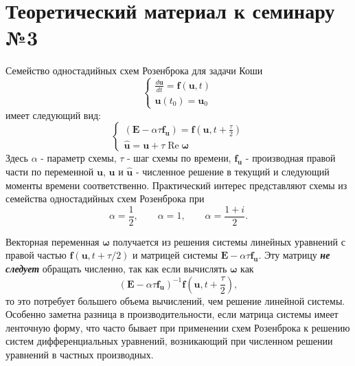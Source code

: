 \section{Теоретический материал к семинару №3}
Семейство одностадийных схем Розенброка для задачи Коши
\begin{equation} \label{c3eq1}
	\begin{cases}
		\displaystyle \frac{d\mathbf{u}}{dt} = \mathbf{f} \left( \mathbf{u}, t \right) \\
		\mathbf{u}(t_0) = \mathbf{u}_0
	\end{cases}
\end{equation}
имеет следующий вид:
\begin{equation} \label{c3eq2}
	\begin{cases}
		\displaystyle \left( \mathbf{E} - \alpha \tau \mathbf{f_u} \right) = \mathbf{f} \left( \mathbf{u}, t + \frac{\tau}{2} \right) \\
		\mathbf{\hat{u}} = \mathbf{u} + \tau \operatorname{Re} \boldsymbol{\omega}
	\end{cases}
\end{equation}
Здесь $\alpha$ - параметр схемы, $\tau$ - шаг схемы по времени, $\mathbf{f_u}$ - производная правой части по переменной $\mathbf{u}$, $\mathbf{u}$ и $\mathbf{\hat{u}}$ - численное решение в текущий и следующий моменты времени соответственно. Практический интерес представляют схемы из семейства одностадийных схем Розенброка при  
\begin{equation} \nonumber
\alpha = \frac{1}{2},
\qquad
\alpha = 1,
\qquad
\alpha = \frac{1+i}{2}.
\end{equation}

Векторная переменная $\boldsymbol{\omega}$ получается из решения системы линейных уравнений с правой частью $\mathbf{f} \left( \mathbf{u}, t + \tau/2 \right)$ и матрицей системы $\mathbf{E} - \alpha \tau \mathbf{f_u}$. Эту матрицу \textbf{\textit{не следует}} обращать численно, так как если вычислять  $\boldsymbol{\omega}$ как 
\begin{equation} \nonumber
	\left( \mathbf{E} - \alpha \tau \mathbf{f_u} \right)^{-1} \mathbf{f} \left( \mathbf{u}, t + \frac{\tau}{2} \right),
\end{equation}
то это потребует большего объема вычислений, чем решение линейной системы. Особенно заметна разница в производительности, если матрица системы имеет ленточную форму, что часто бывает при применении схем Розенброка к решению систем дифференциальных уравнений, возникающий при численном решении уравнений в частных производных.

